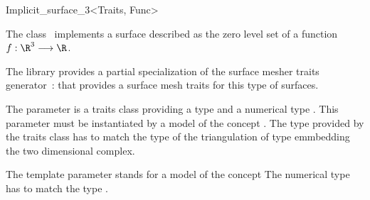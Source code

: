 

\begin{ccRefClass}{Implicit_surface_3<Traits, Func>}  %


\ccDefinition
  
The class \ccRefName\  implements a surface described 
as the zero level
set  of a function $f : \R^3 \longrightarrow \R$.


The library provides a partial specialization
of the  surface mesher traits generator~:
that provides a surface mesh traits for this type of surfaces.


The parameter  is a traits class providing 
a type  and a numerical type .
This parameter  must be instantiated by 
a model of the concept .
The  type provided by the traits class  
has to match  the  type of the
triangulation of  type  emmbedding
the two dimensional complex.

The template parameter   stands for a model
of the concept 
The numerical type  has to match
the type .













\end{ccRefClass}
